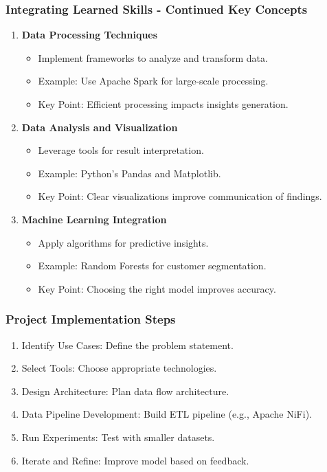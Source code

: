 \documentclass[aspectratio=169]{beamer}
\begin{document}
\begin{frame}[fragile]
    \frametitle{Integrating Learned Skills - Continued Key Concepts}
    \begin{enumerate}[resume]
        \item \textbf{Data Processing Techniques}
            \begin{itemize}
                \item Implement frameworks to analyze and transform data.
                \item Example: Use Apache Spark for large-scale processing.
                \item Key Point: Efficient processing impacts insights generation.
            \end{itemize}
        \item \textbf{Data Analysis and Visualization}
            \begin{itemize}
                \item Leverage tools for result interpretation.
                \item Example: Python's Pandas and Matplotlib.
                \item Key Point: Clear visualizations improve communication of findings.
            \end{itemize}
        \item \textbf{Machine Learning Integration}
            \begin{itemize}
                \item Apply algorithms for predictive insights.
                \item Example: Random Forests for customer segmentation.
                \item Key Point: Choosing the right model improves accuracy.
            \end{itemize}
    \end{enumerate}
\end{frame}

\begin{frame}[fragile]
    \frametitle{Project Implementation Steps}
    \begin{enumerate}
        \item Identify Use Cases: Define the problem statement.
        \item Select Tools: Choose appropriate technologies.
        \item Design Architecture: Plan data flow architecture.
        \item Data Pipeline Development: Build ETL pipeline (e.g., Apache NiFi).
        \item Run Experiments: Test with smaller datasets.
        \item Iterate and Refine: Improve model based on feedback.
    \end{enumerate}
\end{frame}
\end{document}
